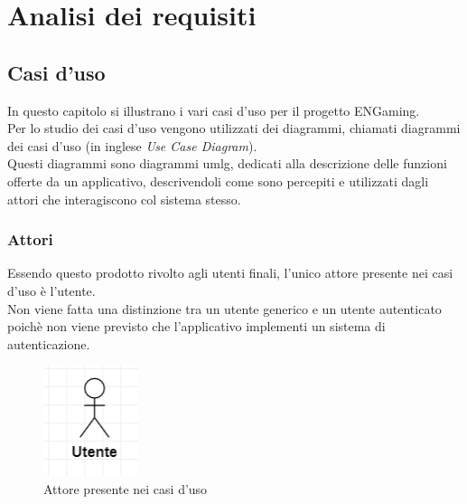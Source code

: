 
\chapter{Analisi dei requisiti}
\label{cap:analisi-requisiti}

\section{Casi d'uso}

In questo capitolo si illustrano i vari casi d'uso per il progetto ENGaming.\\
Per lo studio dei casi d'uso vengono utilizzati dei diagrammi, chiamati diagrammi dei casi d'uso (in inglese \emph{Use Case Diagram}).\\
Questi diagrammi sono diagrammi \gls{umlg}, dedicati alla descrizione delle funzioni offerte da un applicativo, descrivendoli come sono percepiti e utilizzati dagli attori che interagiscono col sistema stesso.

\subsection{Attori}

Essendo questo prodotto rivolto agli utenti finali, l'unico attore presente nei casi d'uso è l'utente.\\
Non viene fatta una distinzione tra un utente generico e un utente autenticato poichè non viene previsto che l'applicativo implementi un sistema di autenticazione.

\begin{figure}[h]
    \centering
    \includegraphics{images/usecase/attore.png}
    \caption{Attore presente nei casi d'uso}
    \label{fig:attore}
\end{figure}
\newpage
